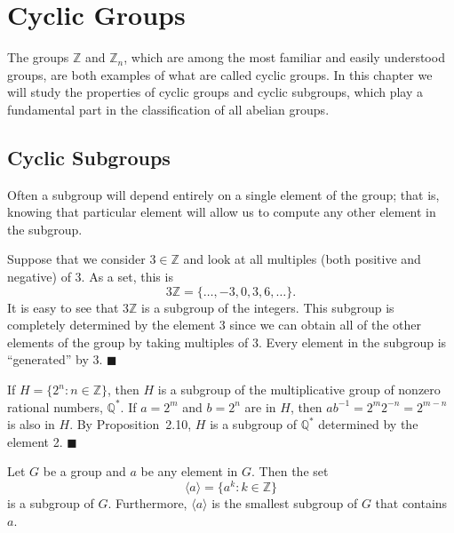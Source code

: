 \chapter{Cyclic Groups}\label{cyclic}
 
The groups $\mathbb Z$ and ${\mathbb Z}_n$, which are among the most familiar and easily understood groups, are both examples of what are called cyclic groups.  In this chapter we will study the properties of cyclic groups and cyclic subgroups, which play a fundamental part in the classification of all abelian groups. 


\section{Cyclic Subgroups}

Often a subgroup will depend entirely on a single element of the group; that is, knowing that particular element will allow us to compute any other element in the subgroup. 

\medskip

Suppose that we consider $3 \in {\mathbb Z}$ and look at all multiples (both positive and negative) of 3.  As a set, this is 
$$
3 {\mathbb Z} = \{ \ldots, -3, 0, 3, 6, \ldots \}.
$$
It is easy to see that $3 {\mathbb Z}$ is a subgroup of the integers.  This subgroup is completely determined by the element 3 since we can obtain all of the other elements of the group by taking multiples of 3.  Every element in the subgroup is ``generated'' by 3. 
\hspace{\fill} $\blacksquare$

\medskip

If $H = \{ 2^n : n \in {\mathbb Z} \}$, then $H$ is a subgroup of the multiplicative group of nonzero rational numbers, ${\mathbb Q}^*$.  If $a = 2^m$ and $b = 2^n$ are in $H$, then $ab^{-1} = 2^m 2^{-n} = 2^{m-n}$ is also in $H$.  By Proposition~2.10, $H$ is a subgroup of ${\mathbb Q}^*$ determined by the element 2. 
\hspace{\fill} $\blacksquare$

\begin{theorem}
Let $G$ be a group and $a$ be any element in $G$.  Then the set
$$
\langle a \rangle  = \{ a^k : k \in {\mathbb Z} \}\label{generatedby}
$$
is a subgroup of $G$.  Furthermore, $\langle a \rangle$ is the smallest subgroup of $G$ that contains~$a$. 
\end{theorem}
 
